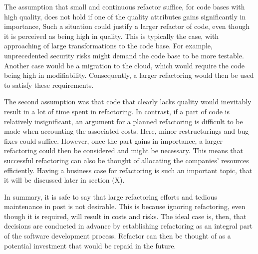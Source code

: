 The assumption that small and continuous refactor suffice, for code bases with high quality, 
	does not hold if one of the quality attributes gains significantly in importance, 
Such a situation could justify a larger refactor of code, 
	even though it is perceived as being high in quality. 
This is typically the case,
	with approaching of large transformations to the code base. 
For example, unprecedented security risks might demand the code base 
	to be more testable.
Another case would be a migration to the cloud, which would require the code being high in modifiability. 
Consequently, a larger refactoring would then be used to satisfy these requirements.

The second assumption was that code that clearly lacks quality 
	would inevitably result in a lot of time spent in refactoring.
In contrast, 
	if a part of code is relatively insignificant,  
	an argument for a planned refactoring is difficult 
	to be made when accounting the associated costs. 
Here, minor restructurings and bug fixes could suffice. 
However, once the part gains in importance, 
	a larger refactoring could then be considered and might be necessary. 
This means that successful refactoring can also be thought of 
	allocating the companies' resources efficiently. 
Having a business case for refactoring is such an important topic, 
	that it will be discussed later in section (X).

In summary, it is safe to say 
	that large refactoring efforts and tedious maintenance in post is not desirable. 
This is because ignoring refactoring, even though it is required,
	will result in costs and risks.
The ideal case is, then, 
	that decisions are conducted in advance 
	by establishing refactoring as an integral part 
	of the software development process.
Refactor can then be thought of as a 
	potential investment that would be repaid in the future. 




